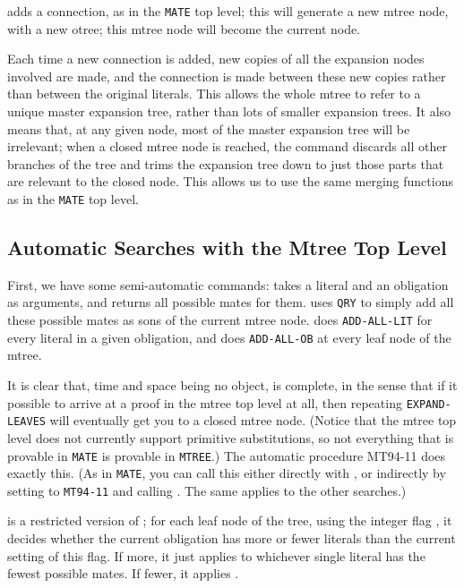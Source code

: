  adds a connection, as in the {\tt MATE} top level; this will generate a new mtree node,
with a new otree; this mtree node will become the current node.

Each time a new connection is added, new copies of all the expansion nodes involved are made, and the connection
is made between these new copies rather than between the original literals. This allows the whole mtree to refer to
a unique master expansion tree, rather than lots of smaller expansion trees. It also means that, at any given node, most
of the master expansion tree will be irrelevant; when a closed
mtree node is reached, the  command discards all other branches of the tree and
trims the expansion tree down to just those parts that are relevant to the closed node. This allows us to use the same
merging functions as in the {\tt MATE} top level.

\subsection{Automatic Searches with the Mtree Top Level}

First, we have some semi-automatic commands:  takes a literal and an obligation as arguments,
and returns all possible mates for them.  uses {\tt QRY} to simply add all these possible
mates as sons of the current mtree node.  does {\tt ADD-ALL-LIT} for every literal
in a given obligation, and  does {\tt ADD-ALL-OB} at every leaf node of the mtree.

It is clear that, time and space being no object,  is complete, in the sense
that if it possible to arrive at a proof in the mtree top level at all, then repeating {\tt EXPAND-LEAVES} will eventually
get you to a closed mtree node. (Notice that the mtree top level does not currently support primitive substitutions,
so not everything that is provable in {\tt MATE} is provable in {\tt MTREE}.)
The automatic procedure MT94-11 does exactly this. (As in {\tt MATE}, you can call this either directly
with , or indirectly by setting  to {\tt MT94-11} and calling
. The same applies to the other searches.)

 is a restricted version of ; for each leaf node of the tree,
using the integer flag
, it decides whether the current obligation has more or fewer literals than
the current setting of this flag. If more, it just applies  to whichever single
literal has the fewest possible mates. If fewer, it applies .

